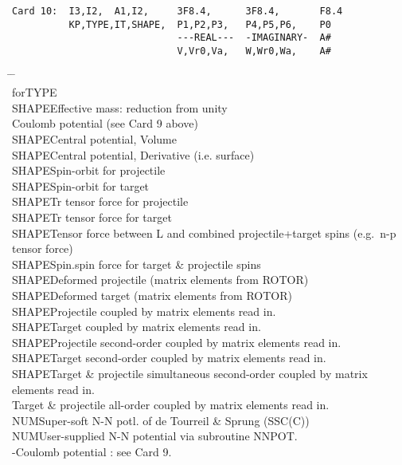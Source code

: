 \documentclass[11pt]{article}
\begin{document}
\begin{verbatim}
Card 10:  I3,I2,  A1,I2,     3F8.4,      3F8.4,       F8.4
          KP,TYPE,IT,SHAPE,  P1,P2,P3,   P4,P5,P6,    P0
                             ---REAL---  -IMAGINARY-  A#
                             V,Vr0,Va,   W,Wr0,Wa,    A#
\end{verbatim}
\vspace*{-10mm}
\begin{tabbing}
\hspace*{5mm} \= \hspace*{1cm} \= \hspace*{2cm} \=
\\
 for\>TYPE\\
\>SHAPE\>Effective mass: reduction from unity\\
\> \>Coulomb potential (see Card 9 above)\\
\>SHAPE\>Central potential, Volume\\
\>SHAPE\>Central potential, Derivative (i.e. surface)\\
\>SHAPE\>Spin-orbit for projectile\\
\>SHAPE\>Spin-orbit for target\\
\>SHAPE\>Tr tensor force for projectile\\
\>SHAPE\>Tr tensor force for target\\
\>SHAPE\>Tensor force between L and combined projectile+target spins
(e.g.~n-p tensor force)\\
\>SHAPE\>Spin.spin force for target \& projectile spins\\
\>SHAPE\>Deformed projectile   (matrix elements from ROTOR)\\
\>SHAPE\>Deformed target       (matrix elements from ROTOR)\\
\>SHAPE\>Projectile coupled by matrix elements read in.\\
\>SHAPE\>Target     coupled by matrix elements read in.\\
\>SHAPE\>Projectile second-order coupled by matrix elements read in.\\
\>SHAPE\>Target second-order coupled by matrix elements read in.\\
\>SHAPE\>Target \& projectile simultaneous second-order coupled by matrix elements read in.\\
\>     \>Target \& projectile all-order coupled by matrix elements read in.\\
\>NUM\>Super-soft N-N potl. of de Tourreil \& Sprung (SSC(C))\\
\>NUM\>User-supplied N-N potential via subroutine NNPOT.\\
\> -\>Coulomb potential : see Card 9.
\end{tabbing}
\end{document}
